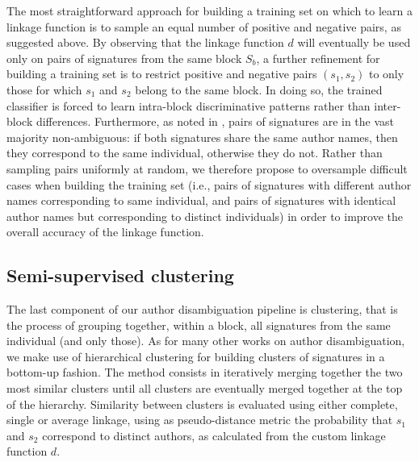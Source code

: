 \documentclass{article}
\begin{document}
The most straightforward approach for building a training set on which to learn
a linkage function is to sample an equal number of positive and negative pairs,
as suggested above. By observing that the linkage function $d$ will eventually
be used only on pairs of signatures from the same block $S_b$, a further
refinement for building a training set is to restrict  positive and negative
pairs $(s_1, s_2)$ to only those for which $s_1$ and $s_2$ belong to the same
block. In doing so, the trained classifier is forced to learn intra-block
discriminative patterns rather than inter-block differences. Furthermore, as
noted in \citep{lange2011frequency}, pairs of signatures are in the vast
majority non-ambiguous: if both signatures share the same author names, then
they correspond to the same individual, otherwise they do not. Rather than
sampling pairs uniformly at random, we therefore propose to  oversample
difficult cases when building the training set (i.e., pairs of signatures with
different author names corresponding to same individual, and pairs of
signatures with identical author names but corresponding to distinct
individuals) in order to improve the overall accuracy of the linkage function.

\subsection{Semi-supervised clustering}
\label{methods:clustering}

The last component of our author disambiguation pipeline is clustering, that is
the process of grouping together, within a block, all signatures from the same
individual (and only those). As for many other works on author disambiguation,
we make use of hierarchical clustering \citep{ward1963hierarchical} for
building clusters of signatures in a bottom-up fashion. The method consists in
iteratively merging together the two most similar clusters until all clusters
are eventually merged together at the top of the hierarchy. Similarity between
clusters is evaluated using either complete, single or average linkage, using
as pseudo-distance metric the probability that $s_1$ and $s_2$ correspond to
distinct authors, as calculated from the custom linkage function $d$.
\end{document}
